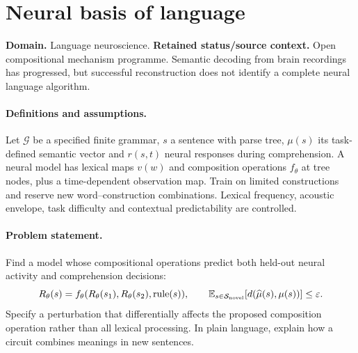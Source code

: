 \documentclass[11pt]{article}
\begin{document}
\section*{Neural basis of language}
\label{prob:117}
\label{rank:14}
\par\smallskip

\noindent\textbf{Domain.} Language neuroscience. \quad \textbf{Retained status/source context.} Open compositional mechanism programme. Semantic decoding from brain recordings has progressed, but successful reconstruction does not identify a complete neural language algorithm.
\paragraph{Definitions and assumptions.} Let $\mathcal G$ be a specified finite grammar, $s$ a sentence with parse tree, $\mu(s)$ its task-defined semantic vector and $r(s,t)$ neural responses during comprehension. A neural model has lexical maps $v(w)$ and composition operations $f_\theta$ at tree nodes, plus a time-dependent observation map. Train on limited constructions and reserve new word--construction combinations. Lexical frequency, acoustic envelope, task difficulty and contextual predictability are controlled.
\paragraph{Problem statement.} Find a model whose compositional operations predict both held-out neural activity and comprehension decisions:
\[
R_\theta(s)=f_\theta(R_\theta(s_1),R_\theta(s_2),\operatorname{rule}(s)),
\qquad
\mathbb{E}_{s\in\mathcal S_{\rm novel}}[d(\widehat\mu(s),\mu(s))]\leq\varepsilon.
\]
Specify a perturbation that differentially affects the proposed composition operation rather than all lexical processing. In plain language, explain how a circuit combines meanings in new sentences.
\end{document}
